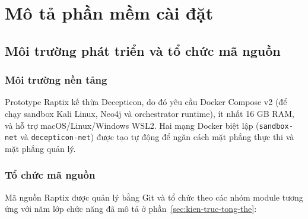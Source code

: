 
\section{Mô tả phần mềm cài đặt}
\label{sec:mo-ta-phan-mem}


\subsection{Môi trường phát triển và tổ chức mã nguồn}
\label{sec:moi-truong-phat-trien}

\subsubsection*{Môi trường nền tảng}

Prototype Raptix kế thừa Decepticon, do đó yêu cầu Docker Compose v2 (để chạy sandbox Kali Linux, Neo4j và orchestrator runtime), ít nhất 16 GB RAM, và hỗ trợ macOS/Linux/Windows WSL2. Hai mạng Docker biệt lập (\texttt{sandbox-net} và \texttt{decepticon-net}) được tạo tự động để ngăn cách mặt phẳng thực thi và mặt phẳng quản lý.

\subsubsection*{Tổ chức mã nguồn}

Mã nguồn Raptix được quản lý bằng Git và tổ chức theo các nhóm module tương ứng với năm lớp chức năng đã mô tả ở phần~\ref{sec:kien-truc-tong-the}:

